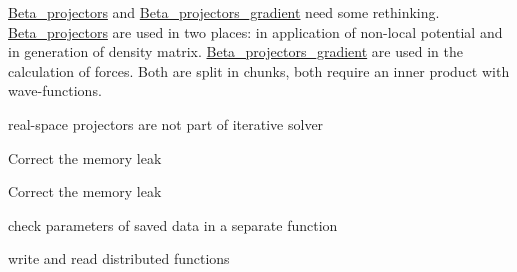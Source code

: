 
\begin{DoxyRefList}
\item[\label{todo__todo000001}%
\hypertarget{todo__todo000001}{}%
Class \hyperlink{classsirius_1_1_beta__projectors}{sirius\+:\+:Beta\+\_\+projectors} ]\hyperlink{classsirius_1_1_beta__projectors}{Beta\+\_\+projectors} and \hyperlink{classsirius_1_1_beta__projectors__gradient}{Beta\+\_\+projectors\+\_\+gradient} need some rethinking. \hyperlink{classsirius_1_1_beta__projectors}{Beta\+\_\+projectors} are used in two places\+: in application of non-\/local potential and in generation of density matrix. \hyperlink{classsirius_1_1_beta__projectors__gradient}{Beta\+\_\+projectors\+\_\+gradient} are used in the calculation of forces. Both are split in chunks, both require an inner product with wave-\/functions.  
\item[\label{todo__todo000002}%
\hypertarget{todo__todo000002}{}%
Class \hyperlink{structsirius_1_1_iterative__solver__input__section}{sirius\+:\+:Iterative\+\_\+solver\+\_\+input\+\_\+section} ]real-\/space projectors are not part of iterative solver  
\item[\label{todo__todo000003}%
\hypertarget{todo__todo000003}{}%
Member \hyperlink{classsirius_1_1_k__point_a6b81e097804738feac48d2a33c4b4aa7}{sirius\+:\+:K\+\_\+point\+:\+:initialize} ()]Correct the memory leak 

Correct the memory leak  
\item[\label{todo__todo000005}%
\hypertarget{todo__todo000005}{}%
Member \hyperlink{classsirius_1_1_k__point__set_afcfce565bf318b680684ba144456a4a4}{sirius\+:\+:K\+\_\+point\+\_\+set\+:\+:load} ()]check parameters of saved data in a separate function  
\item[\label{todo__todo000006}%
\hypertarget{todo__todo000006}{}%
Member \hyperlink{classsirius_1_1_periodic__function_a2193726e9413497c58533954e2bcdc0c}{sirius\+:\+:Periodic\+\_\+function$<$ T $>$\+:\+:hdf5\+\_\+write} (\hyperlink{classsirius_1_1_h_d_f5__tree}{H\+D\+F5\+\_\+tree} h5f)]write and read distributed functions 
\end{DoxyRefList}